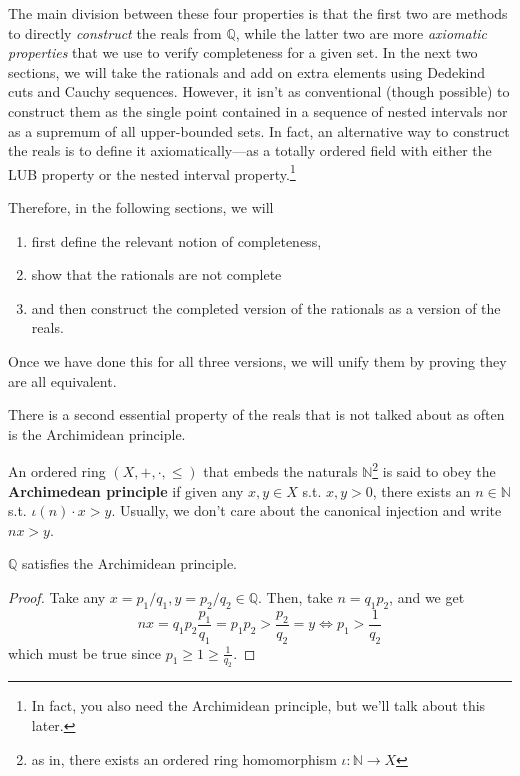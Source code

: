   The main division between these four properties is that the first two are methods to directly \textit{construct} the reals from $\mathbb{Q}$, while the latter two are more \textit{axiomatic properties} that we use to verify completeness for a given set. In the next two sections, we will take the rationals and add on extra elements using Dedekind cuts and Cauchy sequences. However, it isn't as conventional (though possible) to construct them as the single point contained in a sequence of nested intervals nor as a supremum of all upper-bounded sets. In fact, an alternative way to construct the reals is to define it axiomatically---as a totally ordered field with either the LUB property or the nested interval property.\footnote{In fact, you also need the Archimidean principle, but we'll talk about this later.} 

  Therefore, in the following sections, we will 
  \begin{enumerate}
    \item first define the relevant notion of completeness, 
    \item show that the rationals are not complete 
    \item and then construct the completed version of the rationals as a version of the reals. 
  \end{enumerate}
  Once we have done this for all three versions, we will unify them by proving they are all equivalent. 

  There is a second essential property of the reals that is not talked about as often is the Archimidean principle. 

  \begin{definition}
    An ordered ring $(X, +, \cdot, \leq)$ that embeds the naturals $\mathbb{N}$\footnote{as in, there exists an ordered ring homomorphism $\iota: \mathbb{N} \rightarrow X$} is said to obey the \textbf{Archimedean principle} if given any $x, y \in X$ s.t. $x, y > 0$, there exists an $n \in \mathbb{N}$ s.t. $\iota(n) \cdot x > y$. Usually, we don't care about the canonical injection and write $nx > y$. 
  \end{definition} 
  
  \begin{lemma}
    $\mathbb{Q}$ satisfies the Archimidean principle. 
  \end{lemma}
  \begin{proof}
    Take any $x = p_1/q_1, y = p_2 / q_2 \in \mathbb{Q}$. Then, take $n = q_1 p_2$, and we get 
    \begin{equation}
      n x = q_1 p_2 \frac{p_1}{q_1} = p_1 p_2 > \frac{p_2}{q_2} = y \iff p_1 > \frac{1}{q_2}
    \end{equation}
    which must be true since $p_1 \geq 1 \geq \frac{1}{q_2}$. 
  \end{proof}

